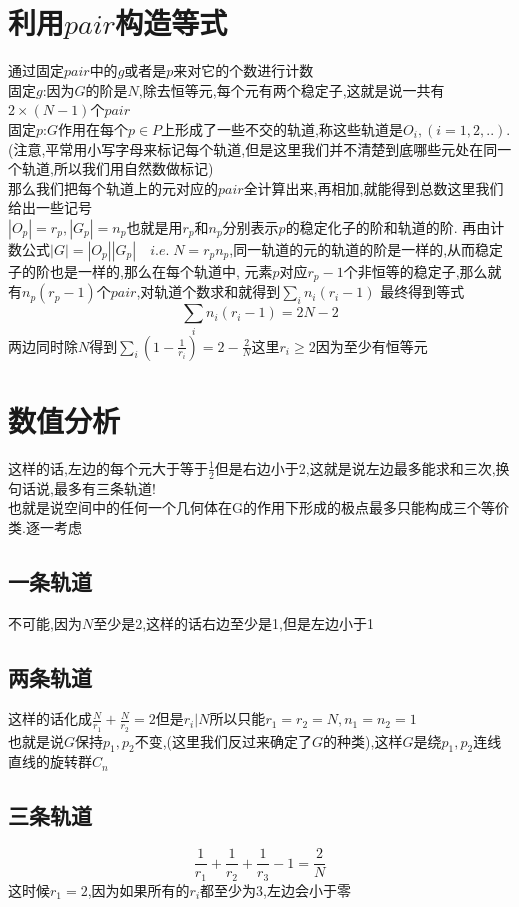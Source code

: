 \documentclass{article}
\begin{document}
    \section{利用$pair$构造等式}
    通过固定$pair$中的$g$或者是$p$来对它的个数进行计数\\
    固定$g$:因为$G$的阶是$N$,除去恒等元,每个元有两个稳定子,这就是说一共有$2\times (N-1)$个$pair$\\
    固定$p$:$G$作用在每个$p\in P$上形成了一些不交的轨道,称这些轨道是$O_i,(i=1,2,..)$.
    \\(注意,平常用小写字母来标记每个轨道,但是这里我们并不清楚到底哪些元处在同一个轨道,所以我们用自然数做标记)
    \\那么我们把每个轨道上的元对应的$pair$全计算出来,再相加,就能得到总数这里我们给出一些记号\\
    $|O_p|=r_p,|G_p|=n_p$也就是用$r_p$和$n_p$分别表示$p$的稳定化子的阶和轨道的阶.
    再由计数公式$|G|=|O_p||G_p| \quad i.e.\;N=r_pn_p$,同一轨道的元的轨道的阶是一样的,从而稳定子的阶也是一样的,那么在每个轨道中,
    元素$p$对应$r_p-1$个非恒等的稳定子,那么就有$n_p(r_p-1)$个$pair$,对轨道个数求和就得到$\sum\limits_{i} n_i(r_i-1)$
    最终得到等式$$\sum\limits_{i} n_i(r_i-1)=2N-2$$
    两边同时除$N$得到$\sum\limits_{i} (1-\frac{1}{r_i})=2-\frac{2}{N}$这里$r_i\ge 2$因为至少有恒等元

    \section{数值分析}
    这样的话,左边的每个元大于等于$\frac{1}{2}$但是右边小于2,这就是说左边最多能求和三次,换句话说,最多有三条轨道!\\
    也就是说空间中的任何一个几何体在G的作用下形成的极点最多只能构成三个等价类.逐一考虑

        \subsection{一条轨道}
            不可能,因为$N$至少是2,这样的话右边至少是1,但是左边小于1

        \subsection{两条轨道}
            这样的话化成$\frac{N}{r_1}+\frac{N}{r_2}=2$但是$r_i|N$所以只能$r_1=r_2=N,n_1=n_2=1$
            \\也就是说$G$保持$p_1,p_2$不变,(这里我们反过来确定了$G$的种类),这样$G$是绕$p_1,p_2$连线直线的旋转群$C_n$
        \subsection{三条轨道}
        $$\frac{1}{r_1}+\frac{1}{r_2}+\frac{1}{r_3}-1=\frac{2}{N}$$
            这时候$r_1=2$,因为如果所有的$r_i$都至少为3,左边会小于零
\end{document}
